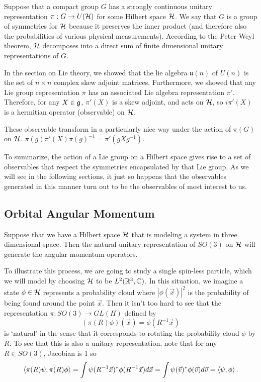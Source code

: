 \documentclass[a4paper]{article}
\begin{document}
Suppose that a compact group $G$ has a strongly continuous unitary representation $\pi: G \to U(\mathcal{H})$ for some Hilbert space $\mathcal{H}$. We say that $G$ is a group of symmetries for $\mathcal{H}$ because it preserves the inner product (and therefore also the probabilities of various physical measurements). According to the Peter Weyl theorem, $\mathcal{H}$ decomposes into a direct sum of finite dimensional unitary representations of $G$.  

In the section on Lie theory, we showed that the lie algebra $\mathfrak{u}(n)$ of $U(n)$ is the set of $n \times n$ complex skew adjoint matrices. Furthermore, we showed that any Lie group representation $\pi$ has an associated Lie algebra representation $\pi'$. Therefore, for any $X \in \mathfrak{g}$, $\pi'(X)$ is a skew adjoint, and acts on $\mathcal{H}$, so $i\pi'(X)$ is a hermitian operator (observable) on $\mathcal{H}$. 

These observable transform in a particularly nice way under the action of $\pi(G)$ on $\mathcal{H}$. $\pi(g)\pi'(X)\pi(g)^{-1} = \pi'(gXg^{-1})$.

To summarize, the action of a Lie group on a Hilbert space gives rise to a set of observables that respect the symmetries encapsulated by that Lie group. As we will see in the following sections, it just so happens that the observables generated in this manner turn out to be the observables of most interest to us.

\subsection{Orbital Angular Momentum}
Suppose that we have a Hilbert space $\mathcal{H}$ that is modeling a system in three dimensional space. Then the natural unitary representation of $SO(3)$ on $\mathcal{H}$ will generate the angular momentum operators. 

To illustrate this process, we are going to study a single spin-less particle, which we will model by choosing $\mathcal{H}$ to be $L^2(\mathbb{R}^3, \mathbb{C})$. In this situation, we imagine a state $\phi \in \mathcal{H}$ represents a probability cloud where $|\phi(\vec{x})|^2$ is the probability of being found around the point $\vec{x}$. Then it isn't too hard to see that the representation $\pi : SO(3) \to GL(H)$ defined by
$$(\pi(R)\phi)(\vec{x}) = \phi(R^{-1}\vec{x})$$
is `natural' in the sense that it corresponds to rotating the probability cloud $\phi$ by $R$. To see that this is also a unitary representation, note that for any $R \in SO(3)$, Jacobian is 1 so 
$$\left\langle \pi(R)\psi , \pi(R)\phi \right\rangle = \int \psi(R^{-1}\vec{x})^* \phi(R^{-1}\vec{x})d\vec{x} = \int \psi(\vec{v})^* \phi(\vec{v})d\vec{v} = \left\langle \psi , \phi \right\rangle.$$
\end{document}
